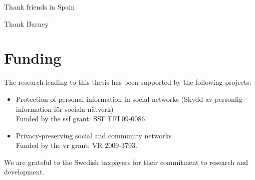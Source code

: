 Thank friends in Spain

Thank Barney


\section*{Funding}
The research leading to this thesis has been supported by the following projects:
\begin{itemize}
    \item Protection of personal information in social networks (Skydd av personlig 
    information f{\"o}r sociala n{\"a}tverk)\\
    Funded by the \ac*{ssf} grant: SSF FFL09-0086.
    \item Privacy-preserving social and community networks\\
    Funded by the \ac*{vr} grant: VR 2009-3793.
\end{itemize}

We are grateful to the Swedish taxpayers for their commitment to research and development.
